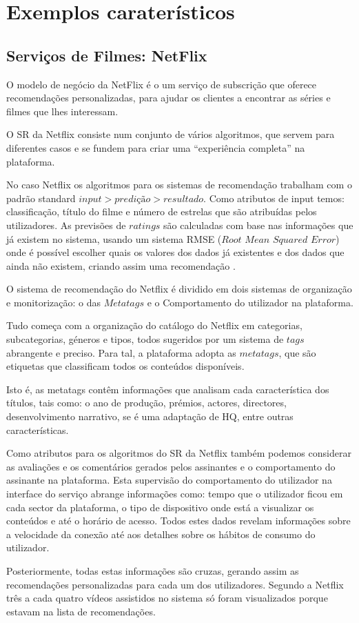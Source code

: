 \section{Exemplos caraterísticos}
\subsection{ Serviços de Filmes: NetFlix}
\par O modelo de negócio da NetFlix é o um serviço de subscrição que oferece recomendações personalizadas, para ajudar os clientes a encontrar as séries e filmes que lhes interessam.
\par O SR da Netflix consiste num conjunto de vários algoritmos, que servem para diferentes casos e se fundem para criar uma “experiência completa” na plataforma.
\par No caso Netflix os algoritmos para os sistemas de recomendação trabalham com o padrão standard $input> predição> resultado$. Como atributos de input temos: classificação, título do filme e número de estrelas que são atribuídas pelos utilizadores. As previsões de $ratings$ são calculadas com base nas informações que já existem no sistema, usando um sistema RMSE ($Root$ $Mean$ $Squared$ $Error$) onde é possível escolher quais os valores dos dados já existentes e dos dados que ainda não existem, criando assim uma recomendação \cite{net}.
\par O sistema de recomendação do Netflix é dividido em dois sistemas de organização e monitorização: o das $Metatags$ e o Comportamento do utilizador na plataforma. 
\par Tudo começa com a organização do catálogo do Netflix em categorias, subcategorias, géneros e tipos, todos sugeridos por um sistema de $tags$ abrangente e preciso. Para tal, a plataforma adopta as $metatags$, que são etiquetas que classificam todos os conteúdos disponíveis. \par Isto é, as metatags contêm informações que analisam cada característica dos títulos, tais como: o ano de produção, prémios, actores, directores, desenvolvimento narrativo, se é uma adaptação de HQ, entre outras características. 
\par Como atributos para os algoritmos do SR da Netflix também podemos considerar as avaliações e os comentários gerados pelos assinantes e o comportamento do assinante na plataforma. Esta supervisão do comportamento do utilizador na interface do serviço abrange informações como: tempo que o utilizador ficou em cada sector da plataforma, o tipo de dispositivo onde está a visualizar os conteúdos e até o horário de acesso. Todos estes dados revelam informações sobre a velocidade da conexão até aos detalhes sobre os hábitos de consumo do utilizador. \par Posteriormente, todas estas informações são cruzas, gerando assim as recomendações personalizadas para cada um dos utilizadores. Segundo a Netflix três a cada quatro vídeos assistidos no sistema só foram visualizados porque estavam na lista de recomendações. 
